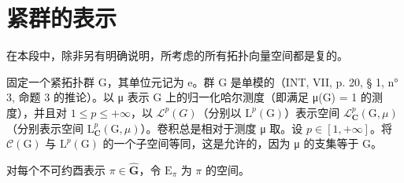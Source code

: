 \section{紧群的表示}

在本段中，除非另有明确说明，所考虑的所有拓扑向量空间都是复的。

固定一个紧拓扑群 G，其单位元记为 e。群 G 是单模的（INT, VII, p. 20, § 1, n° 3, 命题 3 的推论）。以 μ 表示 G 上的归一化哈尔测度（即满足 μ(G) = 1 的测度），并且对 \(1 \leqslant p \leqslant +\infty\)，以 \(\mathcal{L}^{p}(G)\)（分别以 \(\mathrm{L}^{p}(\mathrm{G})\)）表示空间 \(\mathcal{L}_{\mathbf{C}}^{p}(\mathrm{G}, \mu)\)（分别表示空间 \(\mathrm{L}_{\mathbf{C}}^{p}(\mathrm{G}, \mu)\)）。卷积总是相对于测度 μ 取。设 \(p \in [1, +\infty]\)。将 \(\mathcal{C}(\mathrm{G})\) 与 \(\mathrm{L}^{p}(\mathrm{G})\) 的一个子空间等同，这是允许的，因为 μ 的支集等于 G。

对每个不可约酉表示 \(\pi \in \widehat{\mathbf{G}}\)，令 \(\mathrm{E}_{\pi}\) 为 \(\pi\) 的空间。

